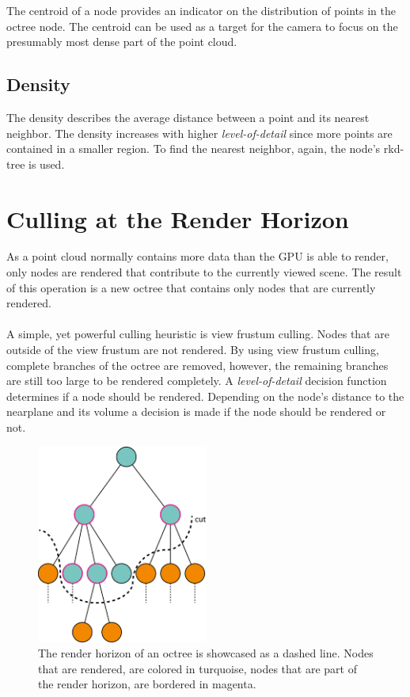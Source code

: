 The centroid of a node provides an indicator on the distribution of points in the octree node. The centroid can be used as a target for the camera to focus on the presumably most dense part of the point cloud. 


\subsection{Density}

The density describes the average distance between a point and its nearest neighbor. The density increases with higher \textit{level-of-detail} since more points are contained in a smaller region. To find the nearest neighbor, again, the node's rkd-tree is used. 


\section{Culling at the Render Horizon}
\label{sec:renderHorizon}

As a point cloud normally contains more data than the GPU is able to render, only nodes are rendered that contribute to the currently viewed scene. The result of this operation is a new octree that contains only nodes that are currently rendered. 
\\
\\
A simple, yet powerful culling heuristic is view frustum culling. Nodes that are outside of the view frustum are not rendered. By using view frustum culling, complete branches of the octree are removed, however, the remaining branches are still too large to be rendered completely. A \textit{level-of-detail} decision function determines if a node should be rendered. Depending on the node's distance to the nearplane and its volume a decision is made if the node should be rendered or not. 

\begin{figure}
    \centering
    \includegraphics[width=0.5\textwidth]{Octree/renderHorizon.png}
    \caption{The render horizon of an octree is showcased as a dashed line. Nodes that are rendered, are colored in turquoise, nodes that are part of the render horizon, are bordered in magenta. }
    \label{fig:renderHorizon}
\end{figure}


